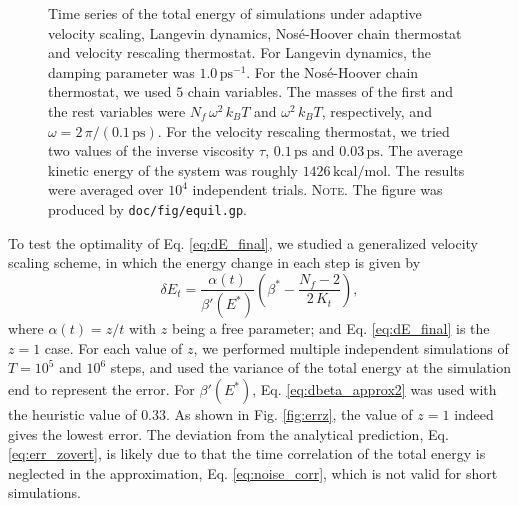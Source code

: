 \documentclass[preprint]{revtex4-1}
\newcommand{\red}[1]{{\color{red} #1}}
\newcommand{\note}[1]{{\color{DarkGreen}\footnotesize \textsc{Note.} #1}}
\begin{document}
\begin{figure}[h]
\begin{center}
  \caption{
    \label{fig:equil}
    Time series of the total energy
    of simulations under
    adaptive velocity scaling,
    Langevin dynamics,
    Nos\'e-Hoover chain thermostat
    and
    velocity rescaling thermostat.
    For Langevin dynamics,
    the damping parameter was $1.0 \, \mathrm{ps}^{-1}$.
    For the Nos\'e-Hoover chain thermostat,
    we used $5$ chain variables. The masses
    of the first and the rest variables
    were $N_f \, \omega^2 \, k_B T$ and
    $\omega^2 \, k_B T$, respectively\cite{martyna1992},
    and
    $\omega = 2 \,\pi/(0.1 \, \mathrm{ps})$.
    For the velocity rescaling thermostat,
    we tried two values of the inverse viscosity $\tau$,
    $0.1 \, \mathrm{ps}$ and $0.03 \, \mathrm{ps}$.
    The average kinetic energy of the system
    was roughly $1426 \, \mathrm{kcal/mol}$.
    The results were averaged over $10^4$ independent trials.
    \note{The figure was produced by \texttt{doc/fig/equil.gp}.
    }%
  }
\end{center}
\end{figure}





To test the optimality of Eq. \eqref{eq:dE_final},
we studied a generalized velocity scaling scheme,
in which the energy change in each step is given by
%
\begin{equation}
  \delta E_t
  =
  \frac{ \alpha(t) } { \beta'(E^*) }
  \left(
   \beta^* -
   \frac{ N_f - 2 }
   { 2 \, K_t }
  \right)
  ,
  \label{eq:dE_mod}
\end{equation}
%
where $\alpha(t) = z/t$ with $z$ being a free parameter;
and Eq. \eqref{eq:dE_final} is the $z = 1$ case.
%
For each value of $z$,
we performed multiple independent simulations of
$T = 10^5$ and $10^6$ steps,
and used the variance of the total energy at the simulation end
to represent the error.
%
For $\beta'(E^*)$,
Eq. \eqref{eq:dbeta_approx2} was used with the heuristic value of $0.33$.
%
As shown in Fig. \ref{fig:errz},
the value of $z = 1$
indeed gives the lowest error.
%
The deviation from the analytical prediction,
Eq. \eqref{eq:err_zovert},
is likely due to that
the time correlation of the total energy
is neglected in the approximation, Eq. \eqref{eq:noise_corr},
which is not valid for short simulations.
\end{document}
